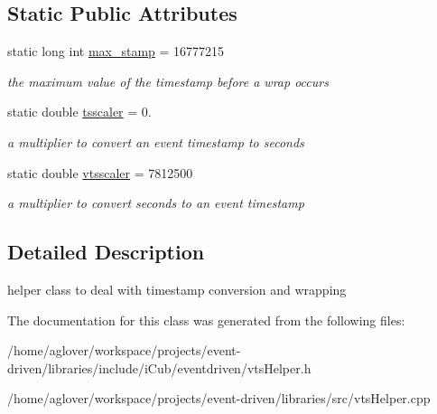 \subsection*{Static Public Attributes}
\begin{DoxyCompactItemize}
\item 
static long int \hyperlink{classev_1_1vtsHelper_a90d44d8ec100b8bd154bf7c87e895d17}{max\+\_\+stamp} = 16777215\hypertarget{classev_1_1vtsHelper_a90d44d8ec100b8bd154bf7c87e895d17}{}\label{classev_1_1vtsHelper_a90d44d8ec100b8bd154bf7c87e895d17}

\begin{DoxyCompactList}\small\item\em the maximum value of the timestamp before a wrap occurs \end{DoxyCompactList}\item 
static double \hyperlink{classev_1_1vtsHelper_ad3ad427d18c24f9655bbc73295abf678}{tsscaler} = 0.\hypertarget{classev_1_1vtsHelper_ad3ad427d18c24f9655bbc73295abf678}{}\label{classev_1_1vtsHelper_ad3ad427d18c24f9655bbc73295abf678}

\begin{DoxyCompactList}\small\item\em a multiplier to convert an event timestamp to seconds \end{DoxyCompactList}\item 
static double \hyperlink{classev_1_1vtsHelper_afa2dd46ae7113668bc6ebea88ab8fa11}{vtsscaler} = 7812500\hypertarget{classev_1_1vtsHelper_afa2dd46ae7113668bc6ebea88ab8fa11}{}\label{classev_1_1vtsHelper_afa2dd46ae7113668bc6ebea88ab8fa11}

\begin{DoxyCompactList}\small\item\em a multiplier to convert seconds to an event timestamp \end{DoxyCompactList}\end{DoxyCompactItemize}


\subsection{Detailed Description}
helper class to deal with timestamp conversion and wrapping 

The documentation for this class was generated from the following files\+:\begin{DoxyCompactItemize}
\item 
/home/aglover/workspace/projects/event-\/driven/libraries/include/i\+Cub/eventdriven/vts\+Helper.\+h\item 
/home/aglover/workspace/projects/event-\/driven/libraries/src/vts\+Helper.\+cpp\end{DoxyCompactItemize}
